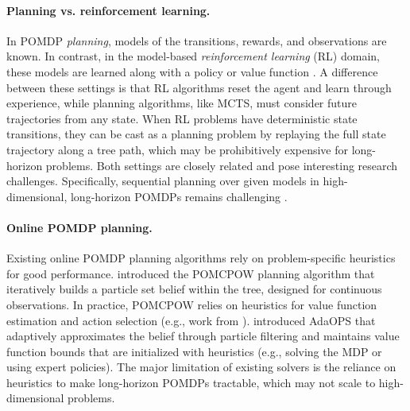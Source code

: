 \paragraph{Planning vs. reinforcement learning.}
In POMDP \textit{planning}, models of the transitions, rewards, and observations are known.
In contrast, in the model-based \textit{reinforcement learning} (RL) domain, these models are learned along with a policy or value function \cite{sutton2018reinforcement}.
A difference between these settings is that RL algorithms reset the agent and learn through experience, while planning algorithms, like MCTS, must consider future trajectories from any state.
When RL problems have deterministic state transitions, they can be cast as a planning problem by replaying the full state trajectory along a tree path, which may be prohibitively expensive for long-horizon problems.
Both settings are closely related and pose interesting research challenges.
Specifically, sequential planning over given models in high-dimensional, long-horizon POMDPs remains challenging \cite{lauri2022partially}.


\paragraph{Online POMDP planning.}
Existing online POMDP planning algorithms rely on problem-specific heuristics for good performance.
\citeauthor{sunberg2018online} introduced the POMCPOW planning algorithm that iteratively builds a particle set belief within the tree, designed for continuous observations.
In practice, POMCPOW relies on heuristics for value function estimation and action selection (e.g., work from \citeauthor{mern2023intelligent}).
\citeauthor{wu2021adaptive} introduced AdaOPS that adaptively approximates the belief through particle filtering and maintains value function bounds that are initialized with heuristics (e.g., solving the MDP or using expert policies).
The major limitation of existing solvers is the reliance on heuristics to make long-horizon POMDPs tractable, which may not scale to high-dimensional problems.

